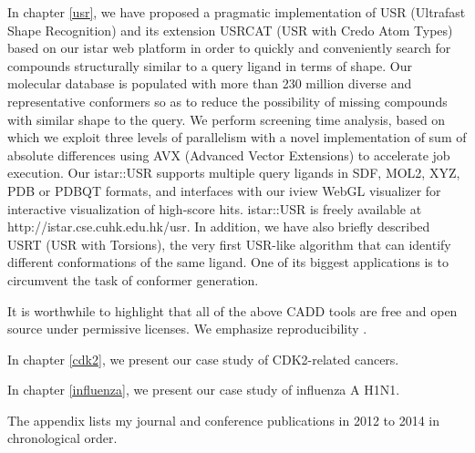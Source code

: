 In chapter \ref{usr}, we have proposed a pragmatic implementation of USR (Ultrafast Shape Recognition) \citep{1379} and its extension USRCAT (USR with Credo Atom Types) \citep{1331} based on our istar web platform in order to quickly and conveniently search for compounds structurally similar to a query ligand in terms of shape. Our molecular database is populated with more than 230 million diverse and representative conformers so as to reduce the possibility of missing compounds with similar shape to the query. We perform screening time analysis, based on which we exploit three levels of parallelism with a novel implementation of sum of absolute differences using AVX (Advanced Vector Extensions) to accelerate job execution. Our istar::USR supports multiple query ligands in SDF, MOL2, XYZ, PDB or PDBQT formats, and interfaces with our iview WebGL visualizer for interactive visualization of high-score hits. istar::USR is freely available at http://istar.cse.cuhk.edu.hk/usr. In addition, we have also briefly described USRT (USR with Torsions), the very first USR-like algorithm that can identify different conformations of the same ligand. One of its biggest applications is to circumvent the task of conformer generation.

It is worthwhile to highlight that all of the above CADD tools are free and open source under permissive licenses. We emphasize reproducibility \citep{965}.

In chapter \ref{cdk2}, we present our case study of CDK2-related cancers.

In chapter \ref{influenza}, we present our case study of influenza A H1N1.

The appendix lists my journal and conference publications in 2012 to 2014 in chronological order.

\chapterend
